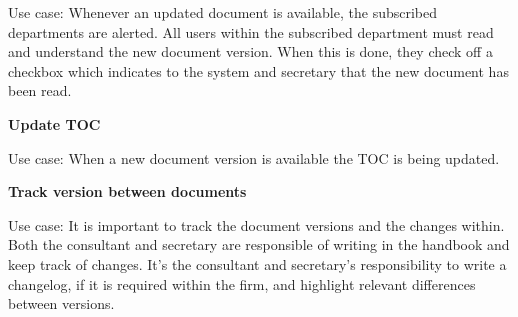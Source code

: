 Use case: Whenever an updated document is available, the subscribed departments are alerted. All users within the subscribed department must read and understand the new document version. When this is done, they check off a checkbox which indicates to the system and secretary that the new document has been read.


\textbf{Update TOC}

Use case: When a new document version is available the TOC is being updated.

\textbf{Track version between documents}

Use case: It is important to track the document versions and the changes within. Both the consultant and secretary are responsible of writing in the handbook and keep track of changes. It’s the consultant and secretary’s responsibility to write a changelog, if it is required within the firm, and highlight relevant differences between versions.

